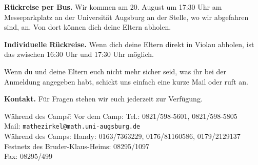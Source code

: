 \documentclass[12pt]{zettel}
\begin{document}
\begin{shaded}
\textbf{Rückreise per Bus.} Wir kommen am 20. August um 17:30 Uhr am Messeparkplatz an der Universität Augsburg an der Stelle, wo wir abgefahren sind, an. Von dort können dich deine Eltern abholen.

\textbf{Individuelle Rückreise.} Wenn dich deine Eltern direkt in Violau abholen, ist das zwischen 16:30 Uhr und 17:30 Uhr möglich.

Wenn du und deine Eltern euch nicht mehr sicher seid, was ihr bei der Anmeldung angegeben habt,
schickt uns einfach eine kurze Mail oder ruft an.
\end{shaded}


\begin{shaded}
\textbf{Kontakt.} Für Fragen stehen wir euch jederzeit zur Verfügung.
\begin{tabbing}
  Während des Camps:\quad \= \kill
  Vor dem Camp: \> Tel.: 0821/598-5601, 0821/598-5805 \\
  \> Mail: \texttt{mathezirkel@math.uni-augsburg.de} \\[0.5em]
  Während des Camps: \> Handy: 0163/7363229, 0176/81160586, 0179/2129137 \\
  \> Festnetz des Bruder-Klaus-Heims: 08295/1097 \\
  \> Fax: 08295/499
\end{tabbing}
\vspace{-1em}
\end{shaded}

\newpage
\end{document}
